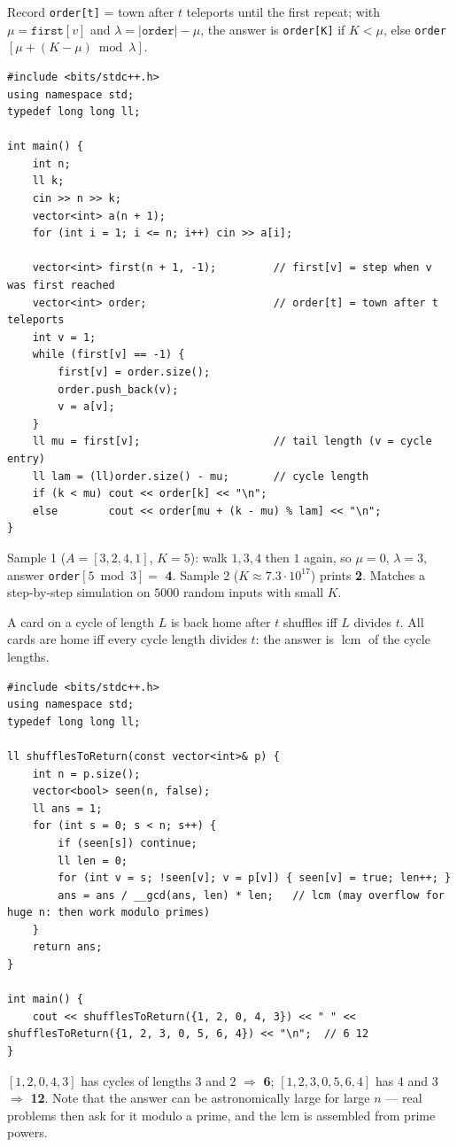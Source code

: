 \begin{solutionbox}[E5.4 Teleporter]
Record \texttt{order[t]} = town after $t$ teleports until the first repeat; with $\mu = \texttt{first}[v]$ and $\lambda = |\texttt{order}| - \mu$, the answer is \texttt{order[K]} if $K < \mu$, else \texttt{order}$[\mu + (K-\mu) \bmod \lambda]$.
\begin{lstlisting}[style=cpp]
#include <bits/stdc++.h>
using namespace std;
typedef long long ll;

int main() {
    int n;
    ll k;
    cin >> n >> k;
    vector<int> a(n + 1);
    for (int i = 1; i <= n; i++) cin >> a[i];

    vector<int> first(n + 1, -1);         // first[v] = step when v was first reached
    vector<int> order;                    // order[t] = town after t teleports
    int v = 1;
    while (first[v] == -1) {
        first[v] = order.size();
        order.push_back(v);
        v = a[v];
    }
    ll mu = first[v];                     // tail length (v = cycle entry)
    ll lam = (ll)order.size() - mu;       // cycle length
    if (k < mu) cout << order[k] << "\n";
    else        cout << order[mu + (k - mu) % lam] << "\n";
}
\end{lstlisting}
Sample 1 ($A = [3,2,4,1]$, $K = 5$): walk $1,3,4$ then $1$ again, so $\mu = 0$, $\lambda = 3$, answer \texttt{order}$[5 \bmod 3] = $ \textbf{4}. Sample 2 ($K \approx 7.3\cdot10^{17}$) prints \textbf{2}. Matches a step-by-step simulation on $5000$ random inputs with small $K$.
\end{solutionbox}

\begin{solutionbox}
A card on a cycle of length $L$ is back home after $t$ shuffles iff $L$ divides $t$. All cards are home iff every cycle length divides $t$: the answer is $\operatorname{lcm}$ of the cycle lengths.
\begin{lstlisting}[style=cpp]
#include <bits/stdc++.h>
using namespace std;
typedef long long ll;

ll shufflesToReturn(const vector<int>& p) {
    int n = p.size();
    vector<bool> seen(n, false);
    ll ans = 1;
    for (int s = 0; s < n; s++) {
        if (seen[s]) continue;
        ll len = 0;
        for (int v = s; !seen[v]; v = p[v]) { seen[v] = true; len++; }
        ans = ans / __gcd(ans, len) * len;   // lcm (may overflow for huge n: then work modulo primes)
    }
    return ans;
}

int main() {
    cout << shufflesToReturn({1, 2, 0, 4, 3}) << " " << shufflesToReturn({1, 2, 3, 0, 5, 6, 4}) << "\n";  // 6 12
}
\end{lstlisting}
$[1,2,0,4,3]$ has cycles of lengths 3 and 2 $\Rightarrow$ \textbf{6}; $[1,2,3,0,5,6,4]$ has 4 and 3 $\Rightarrow$ \textbf{12}. Note that the answer can be astronomically large for large $n$ --- real problems then ask for it modulo a prime, and the lcm is assembled from prime powers.
\end{solutionbox}

